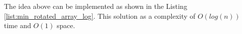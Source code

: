 The idea above can be implemented as shown in the Listing \ref{list:min_rotated_array_log}. This solution as a complexity of $O(log(n))$ time and $O(1)$ space.


